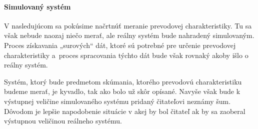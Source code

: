\documentclass[a4paper, 10pt, ]{article}
\begin{document}
\paragraph{Simulovaný systém}

V nasledujúcom sa pokúsime načrtnúť meranie prevodovej charakteristiky. Tu sa však nebude naozaj niečo merať, ale reálny systém bude nahradený simulovaným. Proces získavania „surových“ dát, ktoré sú potrebné pre určenie prevodovej charakteristiky a~proces spracovania týchto dát bude však rovnaký akoby išlo o reálny systém.


Systém, ktorý bude predmetom skúmania, ktorého prevodovú charakteristiku budeme merať, je kyvadlo, tak ako bolo už skôr opísané. Navyše však bude k výstupnej veličine simulovaného systému pridaný čitateľovi neznámy šum. Dôvodom je lepšie napodobenie situácie v akej by bol čitateľ ak by sa zaoberal výstupnou veličinou reálneho systému.
\end{document}
